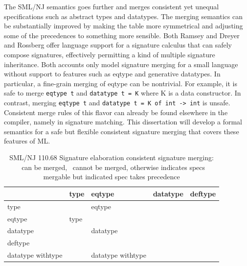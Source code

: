 \documentclass[12pt]{article}
\newcommand{\chk}{\ding{51}}
\newcommand{\ex}{\ding{55}}
\begin{document}
	The SML/NJ semantics goes further and merges consistent yet unequal specifications such as abstract types and datatypes. The merging semantics can be substantially improved by making the table more symmetrical and adjusting some of the precedences to something more sensible. Both Ramsey \cite{ramsey05} and Dreyer and Rossberg \cite{mixml} offer language support for a signature calculus that can safely compose signatures, effectively permitting a kind of multiple signature inheritance. Both accounts only model signature merging for a small language without support to features such as eqtype and generative datatypes. In particular, a fine-grain merging of eqtype can be nontrivial. For example, it is safe to merge \lstinline{eqtype t} and \lstinline{datatype t = K} where K is a data constructor. In contrast, merging \lstinline{eqtype t} and \lstinline{datatype t = K of int -> int} is unsafe. Consistent merge rules of this flavor can already be found elsewhere in the compiler, namely in signature matching. This dissertation will develop a formal semantics for a safe but flexible consistent signature merging that covers these features of ML. 

				\begin{table}
				\begin{tabular}{|l|l|l|l|l|}
				\hline
				     & type & eqtype & datatype & deftype\\
				\hline 
				type & \chk & eqtype & \ex & \ex\\
				\hline
				eqtype & type & \chk & \ex & \ex\\
				\hline
				datatype & \chk & datatype & \ex & \ex\\
				\hline
				deftype & \ex & \ex & \ex & \ex\\
				\hline
				datatype withtype & \chk & datatype withtype & \ex & \ex\\	
				\hline
				\end{tabular} 
				\caption{SML/NJ 110.68 Signature elaboration consistent signature merging: \chk~can be merged, \ex~cannot be merged, otherwise indicates specs mergable but indicated spec takes precedence}
				\label{tbl:njsigmerge}
				\end{table}
				
\end{document}
